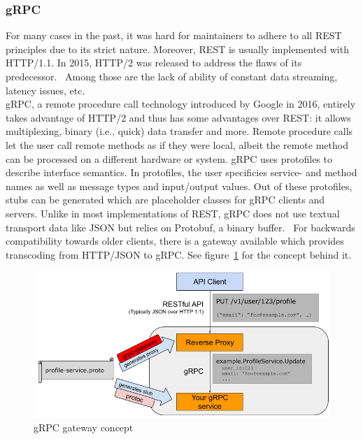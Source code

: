 \subsubsection{gRPC}
For many cases in the past, it was hard for maintainers to adhere to all REST principles due to its strict nature. Moreover, REST is usually implemented with HTTP/1.1. In 2015, HTTP/2 was released to address the flaws of its predecessor.~\cite{Sayfan2018REST2018} Among those are the lack of ability of constant data streaming, latency issues, etc. \\ 
gRPC, a remote procedure call technology introduced by Google in 2016, entirely takes advantage of HTTP/2 and thus has some advantages over REST: it allows multiplexing, binary (i.e., quick) data transfer and more. Remote procedure calls let the user call remote methods as if they were local, albeit the remote method can be processed on a different hardware or system. gRPC uses protofiles to describe interface semantics. In protofiles, the user specificies service- and method names as well as message types and input/output values. Out of these protofiles, stubs can be generated which are placeholder classes for gRPC clients and servers. Unlike in most implementations of REST, gRPC does not use textual transport data like JSON but relies on Protobuf, a binary buffer.~\cite{Google-Cloud-Documentation2018Cloud2018} For backwards compatibility towards older clients, there is a gateway available which provides transcoding from HTTP/JSON to gRPC. See figure~\ref{ESP} for the concept behind it.~\cite{N.A.2017Grpc-gateway.2018} 

\begin{figure}[ht]
	\centering
  \includegraphics[width=\textwidth]{img/grpc_gateway.png}
	\caption[gRPC gateway concept]{gRPC gateway concept~\cite{N.A.2017Grpc-gateway.2018}}
	\label{ESP}
\end{figure}

